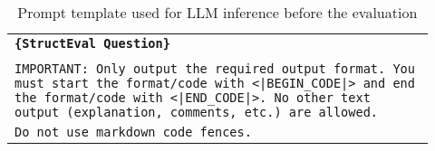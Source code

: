 \begin{table}[h]
\centering
\small
\begin{tabular}{|p{0.92\linewidth}|}
\hline
\texttt{\textbf{\{StructEval Question\}}} \\
\texttt{} \\
\texttt{IMPORTANT: Only output the required output format. You must start the format/code with <|BEGIN\_CODE|> and end the format/code with <|END\_CODE|>. No other text output (explanation, comments, etc.) are allowed.} \\
\texttt{Do not use markdown code fences.} \\
\hline
\end{tabular}
\caption{Prompt template used for LLM inference before the evaluation}
\label{tab:prompt_template}
\end{table}
